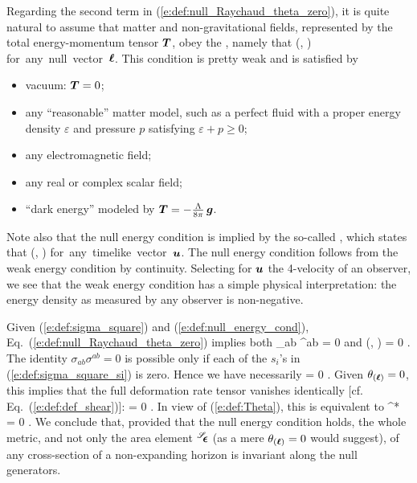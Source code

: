 {{Regarding the second term in (\ref{e:def:null_Raychaud_theta_zero}), it
is quite natural to assume that matter and non-gravitational fields,
represented by the total energy-momentum tensor $\bm{T}$, obey the
,
namely that
\be \label{e:def:null_energy_cond}
    (\wl, \wl)  \quad \mbox{for any null vector $\wl$}.
\ee
This condition is pretty weak and is satisfied by
\begin{itemize}
\item vacuum: $\bm{T}=0$;
\item any ``reasonable'' matter model, such as a perfect fluid with a
proper energy density $\varepsilon$ and pressure $p$ satisfying
$\varepsilon+p\geq 0$;
\item any electromagnetic field;
\item any real or complex scalar field;
\item ``dark energy'' modeled by $\bm{T} = -\frac{\Lambda}{8\pi}\, \bm{g}$.
\end{itemize}
Note also that the null energy condition is implied by the
so-called ,
which states that
\be
    (, )  \quad \mbox{for any timelike vector $\w{u}$}.
\ee
The null energy condition follows from the
weak energy condition by continuity.
Selecting for $\bm{u}$ the 4-velocity of an observer, we see that
the weak energy condition has a simple physical interpretation: the energy
density as measured by any observer is non-negative.

Given (\ref{e:def:sigma_square}) and (\ref{e:def:null_energy_cond}),
Eq.~(\ref{e:def:null_Raychaud_theta_zero})  implies both
\be
    \sigma_{ab} \sigma^{ab}  = 0
\ee
and
\be \label{e:def:T_l_l_zero}
    (\wl, \wl) = 0 .
\ee
The identity $\sigma_{ab} \sigma^{ab} = 0$ is possible only if each of
the $s_i$'s in (\ref{e:def:sigma_square_si}) is zero. Hence we have necessarily
\be
    \w{\sigma} = 0 .
\ee
Given $\theta_{(\bm{\ell})}=0$, this implies that the full deformation rate tensor
vanishes identically [cf. Eq.~(\ref{e:def:def_shear})]:
\be
    \w{\Theta} = 0 .
\ee
In view of (\ref{e:def:Theta}), this is equivalent to
\be \label{e:def:Lie_el_q_zero}
     ^* \Lie{\el}  = 0 .
\ee
We conclude that, provided that the null energy condition holds,
the whole metric, and not only the area element
${}^{\mathscr{S}}\!\!\bm{\epsilon}$ (as a mere $\theta_{(\bm{\ell})}=0$ would suggest), of any cross-section
of a non-expanding horizon is invariant along the null generators.

}}
